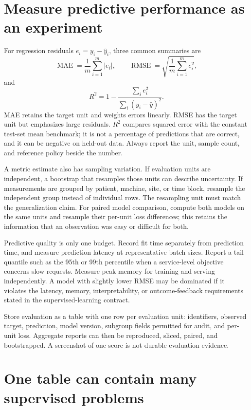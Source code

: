 \section{Measure predictive performance as an experiment}

For regression residuals $e_i=y_i-\widehat y_i$, three common summaries are
\[
\operatorname{MAE}=\frac1m\sum_{i=1}^m|e_i|,
\qquad
\operatorname{RMSE}=\sqrt{\frac1m\sum_{i=1}^m e_i^2},
\]
and
\[
R^2=1-\frac{\sum_i e_i^2}{\sum_i(y_i-\bar y)^2}.
\]
MAE retains the target unit and weights errors linearly. RMSE has the target
unit but emphasizes large residuals. $R^2$ compares squared error with the
constant test-set mean benchmark; it is not a percentage of predictions that
are correct, and it can be negative on held-out data. Always report the unit,
sample count, and reference policy beside the number.

A metric estimate also has sampling variation. If evaluation units are
independent, a bootstrap that resamples those units can describe uncertainty.
If measurements are grouped by patient, machine, site, or time block, resample
the independent group instead of individual rows. The resampling unit must
match the generalization claim. For paired model comparison, compute both
models on the same units and resample their per-unit loss differences; this
retains the information that an observation was easy or difficult for both.

Predictive quality is only one budget. Record fit time separately from
prediction time, and measure prediction latency at representative batch sizes.
Report a tail quantile such as the 95th or 99th percentile when a service-level
objective concerns slow requests. Measure peak memory for training and serving
independently. A model with slightly lower RMSE may be dominated if it violates
the latency, memory, interpretability, or outcome-feedback requirements stated
in the supervised-learning contract.

\begin{professionalbox}
Store evaluation as a table with one row per evaluation unit: identifiers,
observed target, prediction, model version, subgroup fields permitted for audit,
and per-unit loss. Aggregate reports can then be reproduced, sliced, paired,
and bootstrapped. A screenshot of one score is not durable evaluation evidence.
\end{professionalbox}

\section{One table can contain many supervised problems}

